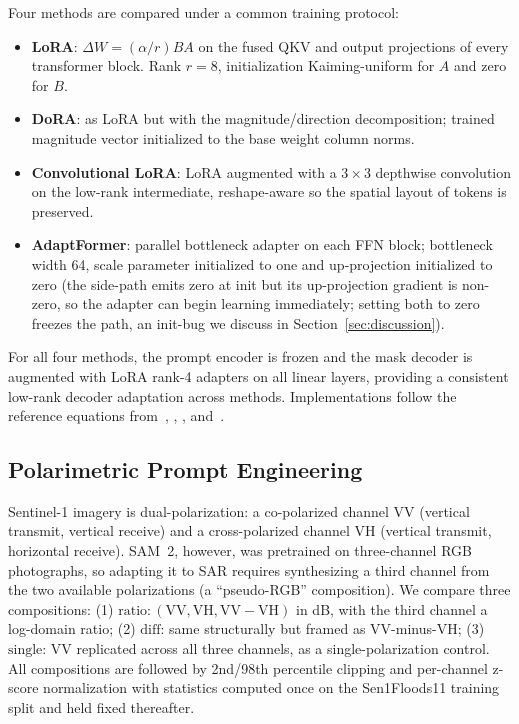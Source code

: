 \documentclass[conference]{IEEEtran}
\begin{document}
Four methods are compared under a common training protocol:
\begin{itemize}
\item \textbf{LoRA}: $\Delta W = (\alpha/r) BA$ on the fused QKV and output projections of every transformer block. Rank $r = 8$, initialization Kaiming-uniform for $A$ and zero for $B$.
\item \textbf{DoRA}: as LoRA but with the magnitude/direction decomposition; trained magnitude vector initialized to the base weight column norms.
\item \textbf{Convolutional LoRA}: LoRA augmented with a $3 \times 3$ depthwise convolution on the low-rank intermediate, reshape-aware so the spatial layout of tokens is preserved.
\item \textbf{AdaptFormer}: parallel bottleneck adapter on each FFN block; bottleneck width 64, scale parameter initialized to one and up-projection initialized to zero (the side-path emits zero at init but its up-projection gradient is non-zero, so the adapter can begin learning immediately; setting both to zero freezes the path, an init-bug we discuss in Section~\ref{sec:discussion}).
\end{itemize}
For all four methods, the prompt encoder is frozen and the mask decoder is augmented with LoRA rank-4 adapters on all linear layers, providing a consistent low-rank decoder adaptation across methods. Implementations follow the reference equations from~\cite{Hu2022LoRA}, \cite{Liu2024DoRA}, \cite{Zhong2024ConvLoRA}, and~\cite{Chen2022AdaptFormer}.

\subsection{Polarimetric Prompt Engineering}

Sentinel-1 imagery is dual-polarization: a co-polarized channel VV (vertical transmit, vertical receive) and a cross-polarized channel VH (vertical transmit, horizontal receive). SAM~2, however, was pretrained on three-channel RGB photographs, so adapting it to SAR requires synthesizing a third channel from the two available polarizations (a ``pseudo-RGB'' composition). We compare three compositions: (1) $\text{ratio}: (\text{VV}, \text{VH}, \text{VV}-\text{VH})$ in dB, with the third channel a log-domain ratio; (2) $\text{diff}$: same structurally but framed as VV-minus-VH; (3) $\text{single}$: VV replicated across all three channels, as a single-polarization control. All compositions are followed by 2nd/98th percentile clipping and per-channel z-score normalization with statistics computed once on the Sen1Floods11 training split and held fixed thereafter.
\end{document}
